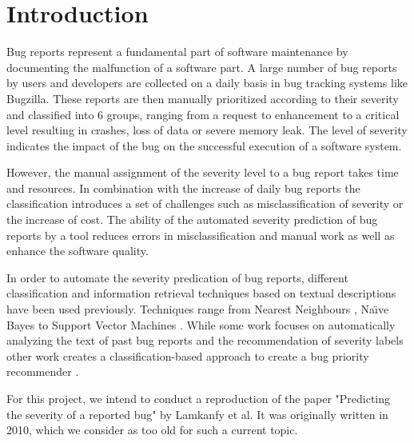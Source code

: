 \documentclass[sigconf,screen]{acmart}
\begin{document}
\section{Introduction}
Bug reports represent a fundamental part of software maintenance by documenting the malfunction of a software part. A large number of bug reports by users and developers are collected on a daily basis in bug tracking systems like Bugzilla. These reports are then manually prioritized according to their severity and classified into 6 groups, ranging from a request to enhancement to a critical level resulting in crashes, loss of data or severe memory leak. The level of severity indicates the impact of the bug on the successful execution of a software system.

However, the manual assignment of the severity level to a bug report takes time and resources. In combination with the increase of daily bug reports the classification introduces a set of challenges such as misclassification of severity or the increase of cost. The ability of the automated severity prediction of bug reports by a tool reduces errors in misclassification and manual work as well as enhance the software quality.

In order to automate the severity predication of bug reports, different classification and information retrieval techniques based on textual descriptions have been used previously. Techniques range from Nearest Neighbours \cite{TianDrone} \cite{LamkanfiMiningAlgo} \cite{ChaturvediBugSeverity}, Na{\"\i}ve Bayes \cite{LamkanfiMiningAlgo} \cite{ChaturvediBugSeverity} to Support Vector Machines \cite{KanwalOMSVM} \cite{LamkanfiMiningAlgo} \cite{ChaturvediBugSeverity}. While some work focuses on automatically analyzing the text of past bug reports and the recommendation of severity labels \cite{TianDrone} \cite{LamkanfiMiningAlgo} \cite{ChaturvediBugSeverity} other work creates a classification-based approach to create a bug priority recommender \cite{KanwalOMSVM}.

For this project, we intend to conduct a reproduction of the paper "Predicting the severity of a reported bug" \cite{ourPaper} by Lamkanfy et al. It was originally written in 2010, which we consider as too old for such a current topic. 





\appendix
\end{document}
